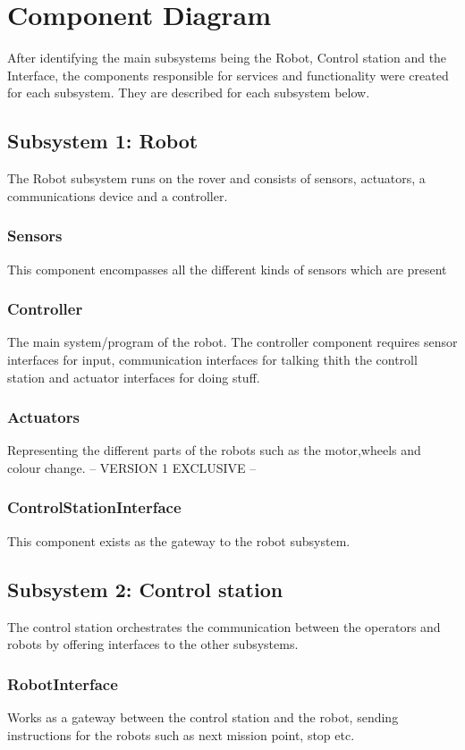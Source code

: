 \section{Component Diagram}
After identifying the main subsystems being the Robot, Control station and the Interface, the components responsible for services and functionality were created for each subsystem. They are described for each subsystem below.
\subsection*{Subsystem 1: Robot}
The Robot subsystem runs on the rover and consists of sensors, actuators, a communications device and a controller.
\subsubsection*{Sensors}
This component encompasses all the different kinds of sensors which are present 

\subsubsection*{Controller}
The main system/program of the robot. The controller component requires sensor interfaces for input, communication interfaces for talking thith the controll station and actuator interfaces for doing stuff.

\subsubsection{Actuators}
Representing the different parts of the robots such as the motor,wheels and colour change.
\newline
-- VERSION 1 EXCLUSIVE --
\subsubsection{ControlStationInterface}
This component exists as the gateway to the robot subsystem. 

\subsection*{Subsystem 2: Control station}
The control station orchestrates the communication between the operators and robots by offering interfaces to the other subsystems.
\subsubsection*{RobotInterface}
Works as a gateway between the control station and the robot, sending instructions for the robots such as next mission point, stop etc.
